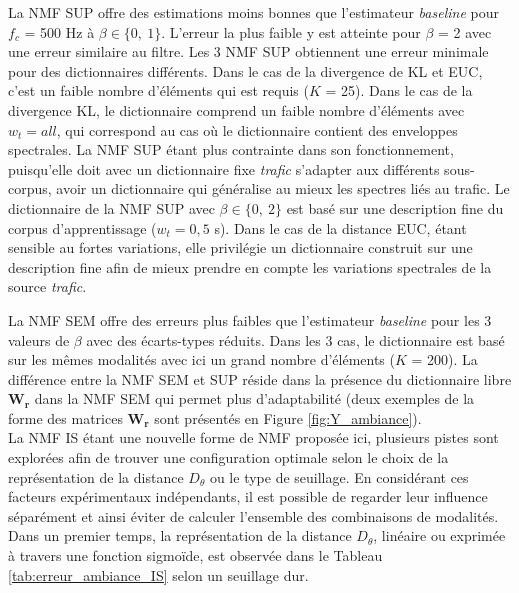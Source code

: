 La NMF SUP offre des estimations moins bonnes que l'estimateur \textit{baseline} pour $f_c$ = 500 Hz à  $\beta \in \lbrace 0,~1 \rbrace$. L'erreur la plus faible y est atteinte pour $\beta$ = 2 avec une erreur similaire au filtre. 
Les 3 NMF SUP obtiennent une erreur minimale pour des dictionnaires différents. Dans le cas de la divergence de KL et EUC, c'est un faible nombre d'éléments qui est requis ($K$ = 25). Dans le cas de la divergence KL, le dictionnaire comprend un faible nombre d'éléments avec $w_t = all$, qui correspond au cas où le dictionnaire contient des enveloppes spectrales. La NMF SUP étant plus contrainte dans son fonctionnement, puisqu'elle doit avec un dictionnaire fixe \textit{trafic} s'adapter aux différents sous-corpus, avoir un dictionnaire qui généralise au mieux les spectres liés au trafic. Le dictionnaire de la NMF SUP avec $\beta \in \lbrace 0,~2 \rbrace$ est basé sur une description fine du corpus d'apprentissage ($w_t = 0,5$ s). Dans le cas de la distance EUC, étant sensible au fortes variations, elle privilégie un dictionnaire construit sur une description fine afin de mieux prendre en compte les variations spectrales de la source \textit{trafic}.

La NMF SEM offre des erreurs plus faibles que l'estimateur \textit{baseline} pour les 3 valeurs de $\beta$ avec des écarts-types réduits. Dans les 3 cas, le dictionnaire est basé sur les mêmes modalités avec ici un grand nombre d'éléments ($K$ = 200). 
La différence entre la NMF SEM et SUP réside dans la présence du dictionnaire libre $\mathbf{W_r}$ dans la NMF SEM qui permet plus d'adaptabilité (deux exemples de la forme des matrices $\mathbf{W_r}$ sont présentés en Figure \ref{fig:Y_ambiance}).\\

La NMF IS étant une nouvelle forme de NMF proposée ici, plusieurs pistes sont explorées afin de trouver une configuration optimale selon le choix de la représentation de la distance $D_{\theta}$ ou le type de seuillage. En considérant ces facteurs expérimentaux indépendants, il est possible de regarder leur influence séparément et ainsi éviter de calculer l'ensemble des combinaisons de modalités. Dans un premier temps, la représentation de la distance $D_{\theta}$, linéaire ou exprimée à travers une fonction sigmoïde, est observée dans le Tableau \ref{tab:erreur_ambiance_IS} selon un seuillage dur. 

